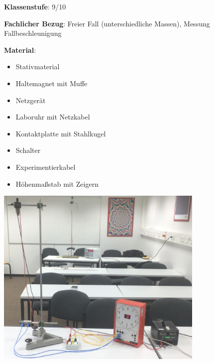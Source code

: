 \documentclass[../main.tex]{subfiles}
\begin{document}
\begin{tcolorbox}[
    width=\textwidth,
    height=\textheight,
    title=Versuch: Freier Fall,
    fonttitle=\Large,
    before title=\vspace{0.2cm}, after title=\vspace{0.2cm},
    colback=white,
    title filled=true, 
    colbacktitle=mygray,
    colframe=black,
    coltitle=black,
]
    
    \vspace{0.2cm}
\textbf{Klassenstufe}: 9/10

    \vspace{0.5cm}
    
    \textbf{Fachlicher Bezug}: Freier Fall (unterschiedliche Massen), Messung Fallbeschleunigung
    
    \vspace{0.5cm}
    
    \begin{minipage}[]{0.45\textwidth}
        \textbf{Material}:
        \begin{itemize}[noitemsep]
            \item Stativmaterial
            \item Haltemagnet mit Muffe
            \item Netzgerät
            \item Laboruhr mit Netzkabel
            \item Kontaktplatte mit Stahlkugel
            \item Schalter
            \item Experimentierkabel
            \item Höhenmaßstab mit Zeigern
        \end{itemize}
    \end{minipage}
    \hspace{0.5cm}
    \begin{minipage}[]{0.5\textwidth}
        \includegraphics[width=0.75\textwidth]{img/versuchsaufbau}
    \end{minipage}


\end{tcolorbox}
\end{document}
